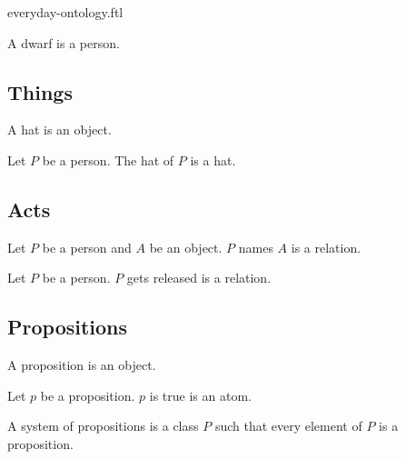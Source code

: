 \documentclass{article}
\begin{document}
\begin{smodule}{everyday-ontology.ftl}
\begin{signature*}[forthel]
  A dwarf is a person.
\end{signature*}


\subsection{Things}

\begin{signature*}[forthel]
  A hat is an object.
\end{signature*}

\begin{signature*}[forthel]
  Let $P$ be a person.
  The hat of $P$ is a hat.
\end{signature*}


\subsection{Acts}

\begin{signature*}[forthel]
  Let $P$ be a person and $A$ be an object.
  $P$ names $A$ is a relation.
\end{signature*}

\begin{signature*}[forthel]
  Let $P$ be a person.
  $P$ gets released is a relation.
  \end{signature*}


\subsection{Propositions}

\begin{signature*}[forthel]
  A proposition is an object.
\end{signature*}

\begin{signature*}[forthel]
  Let $p$ be a proposition.
  $p$ is true is an atom.
\end{signature*}

\begin{definition*}[forthel]
  A system of propositions is a class $P$ such that every element of $P$ is a proposition.
\end{definition*}
\end{smodule}
\end{document}
